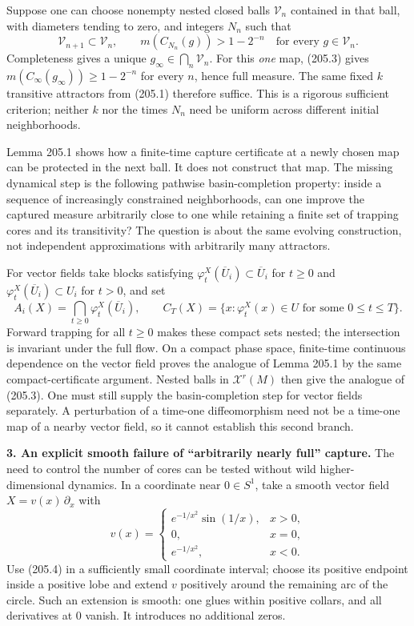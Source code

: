 \documentclass[11pt,a4paper]{article}
\begin{document}
Suppose one can choose nonempty nested closed balls $\mathcal V_n$
contained in that ball, with diameters tending to zero, and integers
$N_n$ such that
\[
 \mathcal V_{n+1}\subset\mathcal V_n,\qquad
 m(C_{N_n}(g))>1-2^{-n}
 \quad\text{for every }g\in\mathcal V_n. \tag{205.3}
\]
Completeness gives a unique $g_\infty\in\bigcap_n\mathcal V_n$.
For this \emph{one} map, (205.3) gives
$m(C_\infty(g_\infty))\ge1-2^{-n}$ for every $n$, hence full measure.
The same fixed $k$ transitive attractors from (205.1) therefore suffice.
This is a rigorous sufficient criterion; neither $k$ nor the times $N_n$
need be uniform across different initial neighborhoods.

Lemma 205.1 shows how a finite-time capture certificate at a newly chosen
map can be protected in the next ball. It does not construct that map.
The missing dynamical step is the following pathwise basin-completion
property: inside a sequence of increasingly constrained neighborhoods,
can one improve the captured measure arbitrarily close to one while
retaining a finite set of trapping cores and its transitivity? The
question is about the same evolving construction, not independent
approximations with arbitrarily many attractors.

For vector fields take blocks satisfying
$\varphi_t^X(\overline U_i)\subset\overline U_i$ for $t\ge0$ and
$\varphi_t^X(\overline U_i)\subset U_i$ for $t>0$, and set
\[
 A_i(X)=\bigcap_{t\ge0}\varphi_t^X(\overline U_i),\qquad
 C_T(X)=\{x:\varphi_t^X(x)\in U\text{ for some }0\le t\le T\}.
\]
Forward trapping for all $t\ge0$ makes these compact sets nested;
the intersection is invariant under the full flow. On a compact phase
space, finite-time continuous dependence on the vector field proves the
analogue of Lemma 205.1 by the same compact-certificate argument. Nested
balls in $\mathcal X^r(M)$ then give the analogue of (205.3). One must
still supply the basin-completion step for vector fields separately.
A perturbation of a time-one diffeomorphism need not be a time-one map
of a nearby vector field, so it cannot establish this second branch.

\textbf{3. An explicit smooth failure of ``arbitrarily nearly full'' capture.}
The need to control the number of cores can be tested without wild
higher-dimensional dynamics. In a coordinate near $0\in S^1$, take a
smooth vector field $X=v(x)\,\partial_x$ with
\[
 v(x)=
 \begin{cases}
  e^{-1/x^2}\sin(1/x),&x>0,\\
  0,&x=0,\\
  e^{-1/x^2},&x<0.
 \end{cases} \tag{205.4}
\]
Use (205.4) in a sufficiently small coordinate interval; choose its
positive endpoint inside a positive lobe and extend $v$ positively
around the remaining arc of the circle. Such an extension is smooth:
one glues within positive collars, and all derivatives at $0$ vanish.
It introduces no additional zeros.
\end{document}
